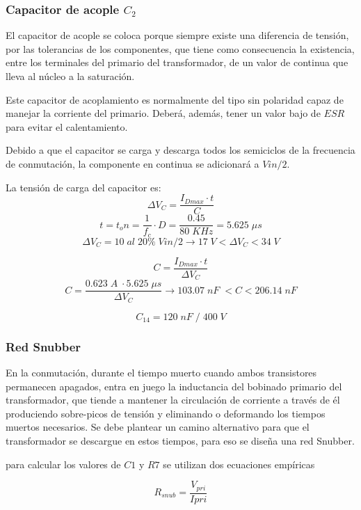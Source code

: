 \documentclass[11pt, a4paper]{article}
\begin{document}
\subsubsection{Capacitor de acople $C_{2}$}
El capacitor de acople se coloca porque siempre existe una diferencia de tensión, por las tolerancias de los componentes, que tiene como consecuencia la existencia, entre los terminales del primario del transformador, de un valor de continua que lleva al núcleo a la saturación. 

Este capacitor de acoplamiento es normalmente del tipo sin polaridad capaz de manejar la corriente del primario. Deberá, además, tener un valor bajo de $ESR$ para evitar el calentamiento.

Debido a que el capacitor se carga y descarga todos los semiciclos de la frecuencia de conmutación, la componente en continua se adicionará a $Vin / 2$.

La tensión de carga del capacitor es:
\begin{equation}
\Delta V_C = \frac{I_{Dmax} \cdot t}{C}
\label{VC}
\end{equation}
\[ t = t_on = \frac{1}{f_c} \cdot D = \frac{0.45}{80 \; KHz} = 5.625 \; \mu s \]
\[ \Delta V_C = 10 \; al \; 20 \% \; Vin / 2 \rightarrow 17 \; V < \Delta V_C < 34 \; V \]

\begin{equation}
C =  \frac{I_{Dmax} \cdot t}{\Delta V_C}
\label{C}
\end{equation}
\[ C =  \frac{0.623 \; A \; \cdot 5.625 \; \mu s}{\Delta V_C} \rightarrow 103.07 \; nF \; < C < 206.14 \; nF \]

\[ C_{14} = 120 \; nF \; / \; 400 \; V \]
\subsubsection{Red Snubber}
En la conmutación, durante el tiempo muerto cuando ambos transistores permanecen apagados, entra
en juego la inductancia del bobinado primario del transformador, que tiende a mantener la circulación
de corriente a través de él produciendo sobre-picos de tensión y eliminando o deformando los tiempos
muertos necesarios. Se debe plantear un camino alternativo para que el transformador se descargue en
estos tiempos, para eso se diseña una red Snubber.

para calcular los valores de $C1$ y $R7$ se utilizan dos ecuaciones empíricas

\begin{equation}
R_{snub} = \frac{V_{pri}}{I{pri}}
\end{equation}
\end{document}
